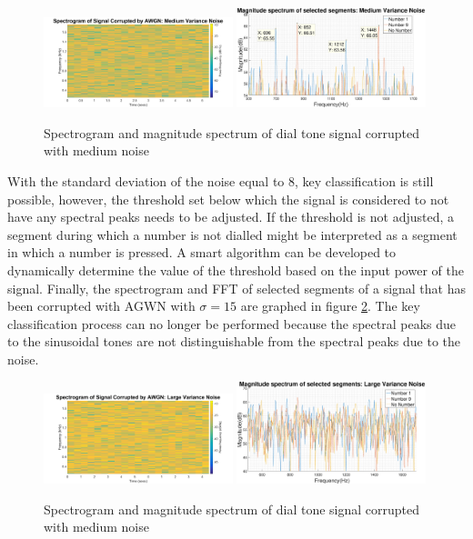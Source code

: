 \documentclass{article}
\begin{document}
\begin{figure}[H]
    \centering
    \includegraphics[width=0.49\textwidth,natwidth=610,natheight=642]{spectrogram_medium_var.png}
    \includegraphics[width=0.49\textwidth]{mag_spec_dial_tone_medium_var}
    \caption{Spectrogram and magnitude spectrum of dial tone signal corrupted with medium noise}
    \label{fig:mag_spec_medium_variance}
\end{figure}

With the standard deviation of the noise equal to 8, key classification is still possible, however, the threshold set below which the signal is considered to not have any spectral peaks needs to be adjusted. If the threshold is not adjusted, a segment during which a number is not dialled might be interpreted as a segment in which a number is pressed. A smart algorithm can be developed to dynamically determine the value of the threshold based on the input power of the signal. Finally, the spectrogram and FFT of selected segments of a signal that has been corrupted with AGWN with $\sigma=15$ are graphed in figure \ref{fig:spec_large_noise}. The key classification process can no longer be performed because the spectral peaks due to the sinusoidal tones are not distinguishable from the spectral peaks due to the noise. 

\begin{figure}[H]
    \centering
    \includegraphics[width=0.49\textwidth,natwidth=610,natheight=642]{spectrogram_large_var.png}
    \includegraphics[width=0.49\textwidth]{mag_spec_dial_tone_large_var}
    \caption{Spectrogram and magnitude spectrum of dial tone signal corrupted with medium noise}
    \label{fig:spec_large_noise}
\end{figure}
\end{document}
